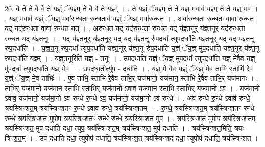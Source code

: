 \documentclass[17pt]{extarticle}
\begin{document}
20. वै ते ते वै वै ते य॒ज्ञ्ं ॅय॒ज्ञ्म् ते वै वै ते य॒ज्ञ्म् । . ते य॒ज्ञ्ं ॅय॒ज्ञ्म् ते ते य॒ज्ञ् मवाव॑ य॒ज्ञ्म् ते ते य॒ज्ञ् मव॑ । . य॒ज्ञ् मवाव॑ य॒ज्ञ्ं ॅय॒ज्ञ् मवा॑रुन्धता रुन्ध॒ताव॑ य॒ज्ञ्ं ॅय॒ज्ञ् मवा॑रुन्धत । . अवा॑रुन्धता रुन्ध॒ता वावा॑ रुन्धत॒ यद् यद॑रुन्ध॒ता वावा॑ रुन्धत॒ यत् । . अ॒रु॒न्ध॒त॒ यद् यद॑रुन्धता रुन्धत॒ यद् य॑ज्ञ्त॒नूर् य॑ज्ञ्त॒नूर् यद॑रुन्धता रुन्धत॒ यद् य॑ज्ञ्त॒नूः । . यद् य॑ज्ञ्त॒नूर् य॑ज्ञ्त॒नूर् यद् यद् य॑ज्ञ्त॒नू रु॑प॒दधा᳚ त्युप॒दधा॑ति यज्ञ्त॒नूर् यद् यद् य॑ज्ञ्त॒नू रु॑प॒दधा॑ति । . य॒ज्ञ्॒त॒नू रु॑प॒दधा᳚ त्युप॒दधा॑ति यज्ञ्त॒नूर् य॑ज्ञ्त॒नू रु॑प॒दधा॑ति य॒ज्ञ्ं ॅय॒ज्ञ् मु॑प॒दधा॑ति यज्ञ्त॒नूर् य॑ज्ञ्त॒नू रु॑प॒दधा॑ति य॒ज्ञ्म् । . य॒ज्ञ्॒त॒नूरिति॑ यज्ञ् - त॒नूः । . उ॒प॒दधा॑ति य॒ज्ञ्ं ॅय॒ज्ञ् मु॑प॒दधा᳚ त्युप॒दधा॑ति य॒ज्ञ् मे॒वैव य॒ज्ञ् मु॑प॒दधा᳚ त्युप॒दधा॑ति य॒ज्ञ् मे॒व । . उ॒प॒दधा॒तीत्यु॑प - दधा॑ति । . य॒ज्ञ् मे॒ वैव य॒ज्ञ्ं ॅय॒ज्ञ् मे॒व ताभि॒ स्ताभि॑ रे॒व य॒ज्ञ्ं ॅय॒ज्ञ् मे॒व ताभिः॑ । . ए॒व ताभि॒ स्ताभि॑ रे॒वैव ताभि॒र् यज॑मानो॒ यज॑मान॒ स्ताभि॑ रे॒वैव ताभि॒र् यज॑मानः । . ताभि॒र् यज॑मानो॒ यज॑मान॒ स्ताभि॒ स्ताभि॒र् यज॑मा॒नो ऽवाव॒ यज॑मान॒ स्ताभि॒ स्ताभि॒र् यज॑मा॒नो ऽव॑ । . यज॑मा॒नो ऽवाव॒ यज॑मानो॒ यज॑मा॒नो ऽव॑ रुन्धे रु॒न्धे ऽव॒ यज॑मानो॒ यज॑मा॒नो ऽव॑ रुन्धे । . अव॑ रुन्धे रु॒न्धे ऽवाव॑ रुन्धे॒ त्रय॑स्त्रिꣳशत॒म् त्रय॑स्त्रिꣳशतꣳ रु॒न्धे ऽवाव॑ रुन्धे॒ त्रय॑स्त्रिꣳशतम् । . रु॒न्धे॒ त्रय॑स्त्रिꣳशत॒म् त्रय॑स्त्रिꣳशतꣳ रुन्धे रुन्धे॒ त्रय॑स्त्रिꣳशत॒ मुपोप॒ त्रय॑स्त्रिꣳशतꣳ रुन्धे रुन्धे॒ त्रय॑स्त्रिꣳशत॒ मुप॑ । . त्रय॑स्त्रिꣳशत॒ मुपोप॒ त्रय॑स्त्रिꣳशत॒म् त्रय॑स्त्रिꣳशत॒ मुप॑ दधाति दधा॒ त्युप॒ त्रय॑स्त्रिꣳशत॒म् त्रय॑स्त्रिꣳशत॒ मुप॑ दधाति । . त्रय॑स्त्रिꣳशत॒मिति॒ त्रयः॑ - त्रिꣳ॒॒श॒त॒म् । . उप॑ दधाति दधा॒ त्युपोप॑ दधाति॒ त्रय॑स्त्रिꣳश॒त् त्रय॑स्त्रिꣳशद् दधा॒ त्युपोप॑ दधाति॒ त्रय॑स्त्रिꣳशत् । \newline
\end{document}
